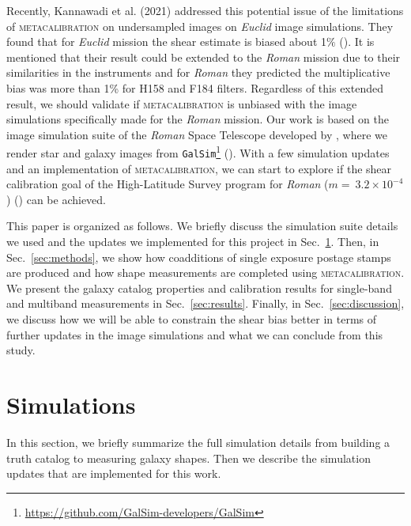 \documentclass[fleqn,usenatbib]{mnras}
\begin{document}
Recently, Kannawadi et al. (2021) addressed this potential issue of the limitations of \textsc{metacalibration} on undersampled images on \emph{Euclid} image simulations. They found that for \emph{Euclid} mission the shear estimate is biased about 1$\%$ (\citealt{2021MNRAS.502.4048K}). It is mentioned that their result could be extended to the \emph{Roman} mission due to their similarities in the instruments and for \emph{Roman} they predicted the multiplicative bias was more than 1\% for H158 and F184 filters. Regardless of this extended result, we should validate if \textsc{metacalibration} is unbiased with the image simulations specifically made for the \emph{Roman} mission. Our work is based on the image simulation suite of the \emph{Roman} Space Telescope developed by \citet{2021MNRAS.501.2044T}, where we render star and galaxy images from \texttt{GalSim}\footnote{\url{ https://github.com/GalSim-developers/GalSim}} (\citealt{2015A&C....10..121R}). With a few simulation updates and an implementation of \textsc{metacalibration}, we can start to explore if the shear calibration goal of the High-Latitude Survey program for \emph{Roman} ($m=~3.2\times10^{-4}$) (\citealt{2019BAAS...51c.341D}) can be achieved. \par


This paper is organized as follows. We briefly discuss the simulation suite details we used and the updates we implemented for this project in Sec.~\ref{sec:sims}. Then, in Sec.~\ref{sec:methods}, we show how coadditions of single exposure postage stamps are produced and how shape measurements are completed using \textsc{metacalibration}. We present the galaxy catalog properties and calibration results for single-band and multiband measurements in Sec.~\ref{sec:results}. Finally, in Sec.~\ref{sec:discussion}, we discuss how we will be able to constrain the shear bias better in terms of further updates in the image simulations and what we can conclude from this study. 


\section{Simulations}
\label{sec:sims}
In this section, we briefly summarize the full simulation details from building a truth catalog to measuring galaxy shapes. Then we describe the simulation updates that are implemented for this work.
\end{document}
